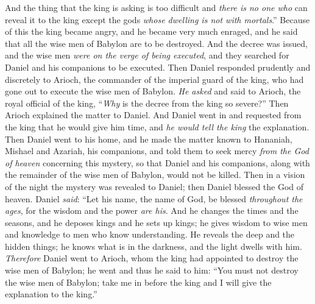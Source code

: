 \begin{biblechapter}
\verse And the thing that the king is asking is too difficult and \textit{there is no one who} can reveal it to the king except the gods \textit{whose dwelling is not with mortals}.”
\verse Because of this the king became angry, and he became very much enraged, and he said that all the wise men of Babylon are to be destroyed.
\verse And the decree was issued, and the wise men \textit{were on the verge of being executed}, and they searched for Daniel and his companions to be executed.
\verse Then Daniel responded prudently and discretely to Arioch, the commander of the imperial guard of the king, who had gone out to execute the wise men of Babylon.
\verse \textit{He asked} and said to Arioch, the royal official of the king, “\textit{Why} is the decree from the king so severe?” Then Arioch explained the matter to Daniel.
\verse And Daniel went in and requested from the king that he would give him time, and \textit{he would tell the king} the explanation.
\verse Then Daniel went to his home, and he made the matter known to Hananiah, Mishael and Azariah, his companions,
\verse and told them to seek mercy \textit{from the God of heaven} concerning this mystery, so that Daniel and his companions, along with the remainder of the wise men of Babylon, would not be killed.
\verse Then in a vision of the night the mystery was revealed to Daniel; then Daniel blessed the God of heaven.
\verse Daniel \textit{said}:
\verse “Let his name, the name of God, be blessed \textit{throughout the ages}, 
for the wisdom and the power \textit{are his}.
\verse And he changes the times and the seasons, 
and he deposes kings and he sets up kings; 
he gives wisdom to wise men 
and knowledge to men who know understanding.
\verse He reveals the deep and the hidden things; 
he knows what is in the darkness, 
and the light dwells with him.
 \textit{Therefore} Daniel went to Arioch, whom the king had appointed to destroy the wise men of Babylon; he went and thus he said to him: “You must not destroy the wise men of Babylon; take me in before the king and I will give the explanation to the king.”

\end{biblechapter}

